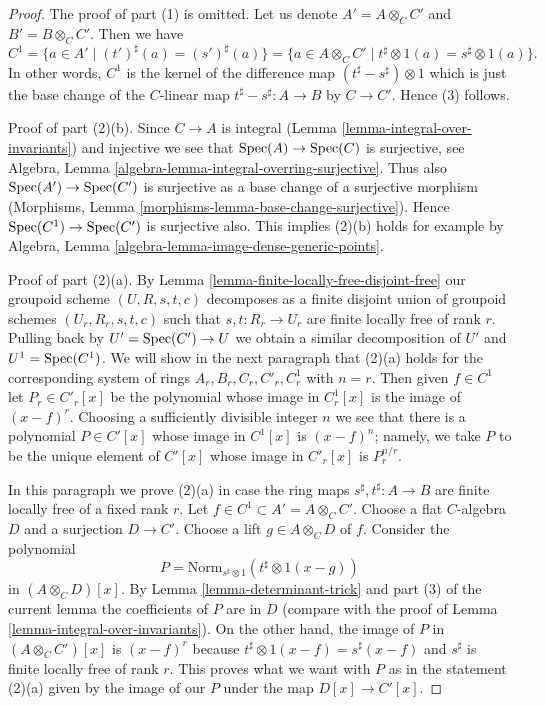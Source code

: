 \begin{proof}
The proof of part (1) is omitted. Let us denote $A' = A \otimes_C C'$ and
$B' = B \otimes_C C'$. Then we have
$$
C^1
= \{a \in A' \mid (t')^\sharp(a) = (s')^\sharp(a) \}
= \{a \in A \otimes_C C' \mid t^\sharp \otimes 1(a) = s^\sharp \otimes 1(a) \}.
$$
In other words, $C^1$ is the kernel of the difference map
$(t^\sharp - s^\sharp) \otimes 1$ which is just the base change
of the $C$-linear map $t^\sharp - s^\sharp : A \to B$ by $C \to C'$.
Hence (3) follows.

\medskip\noindent
Proof of part (2)(b). Since $C \to A$ is integral
(Lemma \ref{lemma-integral-over-invariants}) and injective we see that
$\mathop{\mathrm{Spec}}(A) \to \mathop{\mathrm{Spec}}(C)$ is surjective, see
Algebra, Lemma \ref{algebra-lemma-integral-overring-surjective}.
Thus also $\mathop{\mathrm{Spec}}(A') \to \mathop{\mathrm{Spec}}(C')$ is surjective
as a base change of a surjective morphism
(Morphisms, Lemma \ref{morphisms-lemma-base-change-surjective}).
Hence $\mathop{\mathrm{Spec}}(C^1) \to \mathop{\mathrm{Spec}}(C')$ is surjective also.
This implies (2)(b) holds for example by
Algebra, Lemma \ref{algebra-lemma-image-dense-generic-points}.

\medskip\noindent
Proof of part (2)(a). By Lemma \ref{lemma-finite-locally-free-disjoint-free}
our groupoid scheme $(U, R, s, t, c)$ decomposes as a finite disjoint union
of groupoid schemes $(U_r, R_r, s, t, c)$ such that $s, t : R_r \to U_r$
are finite locally free of rank $r$. Pulling back by $U' = \mathop{\mathrm{Spec}}(C') \to U$
we obtain a similar decomposition of $U'$ and $U^1 = \mathop{\mathrm{Spec}}(C^1)$.
We will show in the next paragraph that (2)(a) holds for the corresponding
system of rings $A_r, B_r, C_r, C'_r, C^1_r$ with $n = r$.
Then given $f \in C^1$ let $P_r \in C'_r[x]$ be the polynomial
whose image in $C^1_r[x]$ is the image of $(x - f)^r$.
Choosing a sufficiently divisible integer $n$ we see that
there is a polynomial $P \in C'[x]$ whose image in $C^1[x]$ is
$(x - f)^n$; namely, we take $P$ to be the unique element of
$C'[x]$ whose image in $C'_r[x]$ is $P_r^{n/r}$.

\medskip\noindent
In this paragraph we prove (2)(a) in case the ring maps
$s^\sharp, t^\sharp : A \to B$ are finite locally free of a fixed rank $r$.
Let $f \in C^1 \subset A' = A \otimes_C C'$. Choose a flat
$C$-algebra $D$ and a surjection $D \to C'$. Choose a lift
$g \in A \otimes_C D$ of $f$.
Consider the polynomial
$$
P = \text{Norm}_{s^\sharp \otimes 1}(t^\sharp \otimes 1(x - g))
$$
in $(A \otimes_C D)[x]$. By Lemma \ref{lemma-determinant-trick}
and part (3) of the current lemma the coefficients of $P$ are in $D$
(compare with the proof of Lemma \ref{lemma-integral-over-invariants}).
On the other hand, the image of $P$ in $(A \otimes_C C')[x]$ is
$(x - f)^r$ because $t^\sharp \otimes 1(x - f) = s^\sharp(x - f)$
and $s^\sharp$ is finite locally free of rank $r$.
This proves what we want with $P$ as in the statement (2)(a)
given by the image of our $P$ under the map $D[x] \to C'[x]$.
\end{proof}

